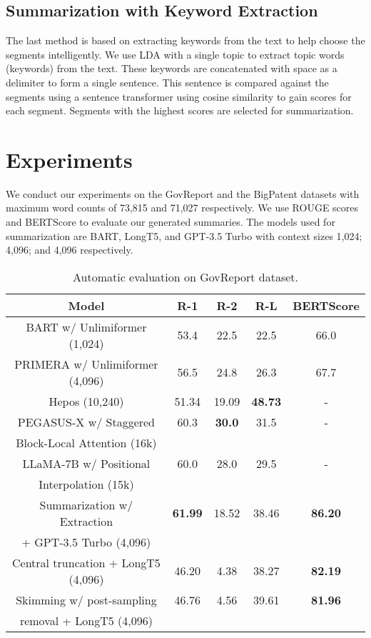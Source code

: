 \documentclass[letterpaper]{article} %
\begin{document}
  \subsection{Summarization with Keyword Extraction}

    The last method is based on extracting keywords from the text to help choose the
    segments intelligently.
    We use LDA \cite{blei2003latent} with a single topic to extract topic words (keywords)
    from the text.
    These keywords are concatenated with space as a delimiter to form a single sentence.
    This sentence is compared against the segments using a sentence transformer using
    cosine similarity to gain scores for each segment.
    Segments with the highest scores are selected for summarization.


\section{Experiments}

  We conduct our experiments on the GovReport \cite{huang-etal-2021-efficient} and the
  BigPatent \cite{sharma-etal-2019-bigpatent} datasets with maximum word counts of 73,815 and
  71,027 respectively.
  We use ROUGE scores \cite{lin-2004-rouge} and BERTScore \cite{zhang2019bertscore} to evaluate
  our generated summaries.
  The models used for summarization are BART, LongT5, and GPT-3.5 Turbo with context sizes
  1,024; 4,096; and 4,096 respectively.

  \begin{table}[!ht]
    \centering
    \scriptsize

    \begin{tabular}{c c c c c}
      \hline
      Model & R-1 & R-2 & R-L & BERTScore \\
      \hline
      BART w/ Unlimiformer (1,024) & 53.4 & 22.5 & 22.5 & 66.0 \\
      PRIMERA w/ Unlimiformer (4,096) & 56.5 & 24.8 & 26.3 & 67.7 \\
      Hepos (10,240) & 51.34 & 19.09 & \textbf{48.73} & - \\
      PEGASUS-X w/ Staggered & 60.3 & \textbf{30.0} & 31.5 & - \\
      Block-Local Attention (16k) & & & & \\
      LLaMA-7B w/ Positional & 60.0 & 28.0 & 29.5 & - \\
      Interpolation (15k) & & & & \\
      \hline
      Summarization w/ Extraction & \textbf{61.99} & 18.52 & 38.46 & \textbf{86.20} \\
      + GPT-3.5 Turbo (4,096) & & & & \\
      Central truncation + LongT5 (4,096) & 46.20 & 4.38 & 38.27 & \textbf{82.19} \\
      Skimming w/ post-sampling & 46.76 & 4.56 & 39.61 & \textbf{81.96} \\
      removal + LongT5 (4,096) & & & & \\
      \hline
    \end{tabular}

    \caption{Automatic evaluation on GovReport dataset.}
    \label{tab:govreport}
  \end{table}
\end{document}
